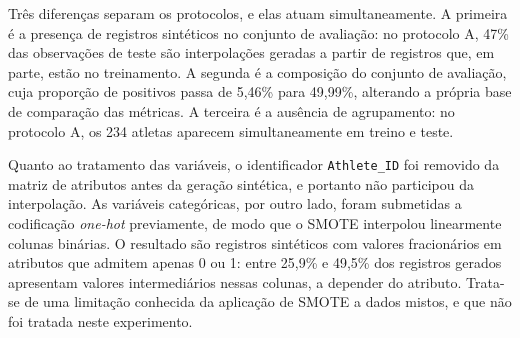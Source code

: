 \begin{table}[H]
\centering
\caption{Caracterização dos dois protocolos de SMOTE.}
\label{tab:protocolos_smote}
\end{table}

Três diferenças separam os protocolos, e elas atuam simultaneamente. A primeira é a presença de registros sintéticos no conjunto de avaliação: no protocolo A, 47\% das observações de teste são interpolações geradas a partir de registros que, em parte, estão no treinamento. A segunda é a composição do conjunto de avaliação, cuja proporção de positivos passa de 5{,}46\% para 49{,}99\%, alterando a própria base de comparação das métricas. A terceira é a ausência de agrupamento: no protocolo A, os 234 atletas aparecem simultaneamente em treino e teste.

Quanto ao tratamento das variáveis, o identificador \texttt{Athlete\_ID} foi removido da matriz de atributos antes da geração sintética, e portanto não participou da interpolação. As variáveis categóricas, por outro lado, foram submetidas a codificação \textit{one-hot} previamente, de modo que o SMOTE interpolou linearmente colunas binárias. O resultado são registros sintéticos com valores fracionários em atributos que admitem apenas 0 ou 1: entre 25{,}9\% e 49{,}5\% dos registros gerados apresentam valores intermediários nessas colunas, a depender do atributo. Trata-se de uma limitação conhecida da aplicação de SMOTE a dados mistos, e que não foi tratada neste experimento.

